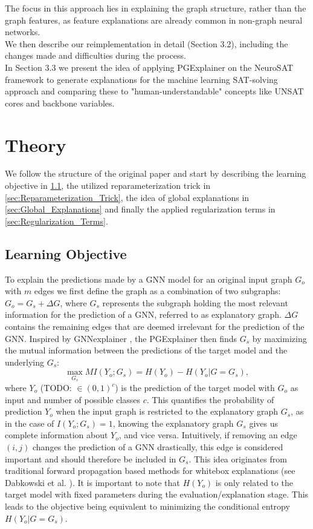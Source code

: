 The focus in this approach lies in explaining the graph structure, rather than the graph features, as feature explanations are already common in non-graph neural networks. \\

We then describe our reimplementation in detail (Section 3.2), including the changes made and difficulties during the process. \\

In Section 3.3 we present the idea of applying PGExplainer on the NeuroSAT framework to generate explanations for the machine learning SAT-solving approach and comparing these to "human-understandable" concepts like UNSAT cores and backbone variables. 

\section{Theory}
We follow the structure of the original paper \cite{luo2020parameterized} and start by describing the learning objective in \ref{sec:learning_objective}, the utilized reparameterization trick in \ref{sec:Reparameterization_Trick}, the idea of global explanations in \ref{sec:Global_Explanations} and finally the applied regularization terms in \ref{sec:Regularization_Terms}.

\subsection{Learning Objective}
\label{sec:learning_objective}
To explain the predictions made by a GNN model for an original input graph $G_o$ with $m$ edges we first define the graph as a combination of two subgraphs: $G_o = G_s + \Delta G$, where $G_s$ represents the subgraph holding the most relevant information for the prediction of a GNN, referred to as explanatory graph. $\Delta G$ contains the remaining edges that are deemed irrelevant for the prediction of the GNN. Inspired by GNNexplainer \cite{ying2019gnnexplainer}, the PGExplainer then finds $G_s$ by maximizing the mutual information between the predictions of the target model and the underlying $G_s$:
\begin{equation}
    \max_{G_s} MI(Y_o;G_s) = H(Y_o) - H(Y_o|G=G_s),
\end{equation} 
where $Y_o$ (TODO: $\in (0,1)^c$) is the prediction of the target model with $G_o$ as input and number of possible classes $c$. This quantifies the probability of prediction $Y_o$ when the input graph is restricted to the explanatory graph $G_s$, as in the case of $I(Y_o;G_s) = 1$, knowing the explanatory graph $G_s$ gives us complete information about $Y_o$, and vice versa. Intuitively, if removing an edge $(i,j)$ changes the prediction of a GNN drastically, this edge is considered important and should therefore be included in $G_s$. This idea originates from traditional forward propagation based methods for whitebox explanations (see Dabkowski et al. \cite{dabkowski2017real}).
It is important to note that $H(Y_o)$ is only related to the target model with fixed parameters during the evaluation/explanation stage. This leads to the objective being equivalent to minimizing the conditional entropy $H(Y_o|G=G_s)$.

